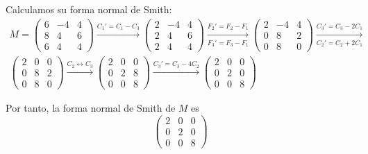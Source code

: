 \documentclass[12pt]{article}
\begin{document}
\begin{ejercicio}
\begin{enumerate}
                Calculamos su forma normal de Smith:
                \begin{multline*}
                    M = \begin{pmatrix}
                        6 & -4 & 4 \\
                        8 & 4 & 6 \\
                        6 & 4 & 4
                    \end{pmatrix}
                    \xrightarrow{C_1'=C_1-C_3}
                    \begin{pmatrix}
                        2 & -4 & 4 \\
                        2 & 4 & 6 \\
                        2 & 4 & 4
                    \end{pmatrix}
                    \xrightarrow[F_3'=F_3-F_1]{F_2'=F_2-F_1}
                    \begin{pmatrix}
                        2 & -4 & 4 \\
                        0 & 8 & 2 \\
                        0 & 8 & 0
                    \end{pmatrix}
                    \xrightarrow[C_2'=C_2+2C_1]{C_3'=C_3-2C_1}\\
                    \begin{pmatrix}
                        2 & 0 & 0 \\
                        0 & 8 & 2 \\
                        0 & 8 & 0
                    \end{pmatrix}
                    \xrightarrow{C_2\leftrightarrow C_3}
                    \begin{pmatrix}
                        2 & 0 & 0 \\
                        0 & 2 & 8 \\
                        0 & 0 & 8
                    \end{pmatrix}
                    \xrightarrow{C_3'=C_3-4C_2}
                    \begin{pmatrix}
                        2 & 0 & 0 \\
                        0 & 2 & 0 \\
                        0 & 0 & 8
                    \end{pmatrix}
                \end{multline*}

                Por tanto, la forma normal de Smith de $M$ es
                \[
                    \begin{pmatrix}
                        2 & 0 & 0 \\
                        0 & 2 & 0 \\
                        0 & 0 & 8
                    \end{pmatrix}
                \]


\end{enumerate}
\end{ejercicio}
\end{document}
